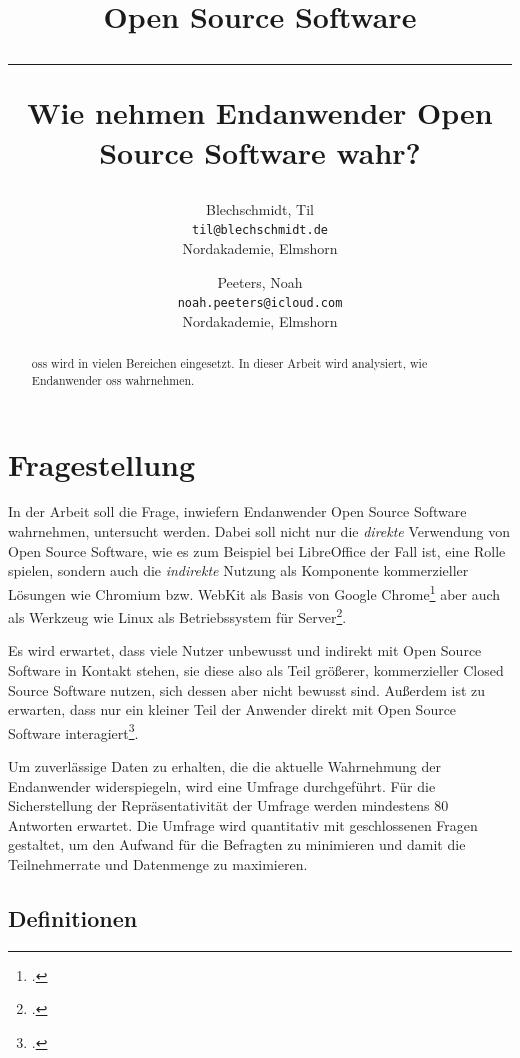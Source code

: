 \documentclass[a4paper]{article}
\title{Open Source Software \\
    \noindent\rule[0.25ex]{\linewidth}{0.5pt}
    \large Wie nehmen Endanwender Open Source Software wahr?
}
\author{
  Blechschmidt, Til\\
  \texttt{til@blechschmidt.de}\\
  Nordakademie, Elmshorn
  \and
  Peeters, Noah\\
  \texttt{noah.peeters@icloud.com}\\
  Nordakademie, Elmshorn
}
\begin{document}
    \thispagestyle{fancy}
    \maketitle

    \begin{abstract}
         \gls{oss} wird in vielen Bereichen eingesetzt. In dieser Arbeit wird analysiert, wie Endanwender \gls{oss} wahrnehmen.
    \end{abstract}
    \newpage

    \tableofcontents
    \clearpage

    
                    
    \section{Fragestellung}
        In der Arbeit soll die Frage, inwiefern Endanwender Open Source Software wahrnehmen, untersucht werden. Dabei soll nicht nur die \emph{direkte} Verwendung von Open Source Software, wie es zum Beispiel bei LibreOffice der Fall ist, eine Rolle spielen, sondern auch die \emph{indirekte} Nutzung als Komponente kommerzieller Lösungen wie Chromium bzw. WebKit als Basis von Google Chrome\footcite{is:open:source:right:for:you} aber auch als Werkzeug wie Linux als Betriebssystem für Server\footcite{report:BaselineScenario}.
		
		Es wird erwartet, dass viele Nutzer unbewusst und indirekt mit Open Source Software in Kontakt stehen, sie diese also als Teil größerer, kommerzieller Closed Source Software nutzen, sich dessen aber nicht bewusst sind. Außerdem ist zu erwarten, dass nur ein kleiner Teil der Anwender direkt mit Open Source Software interagiert\footcite{oss:lotus-to-linux}.
		
		Um zuverlässige Daten zu erhalten, die die aktuelle Wahrnehmung der Endanwender widerspiegeln, wird eine Umfrage durchgeführt. Für die Sicherstellung der Repräsentativität der Umfrage werden mindestens 80 Antworten erwartet.
		Die Umfrage wird quantitativ mit geschlossenen Fragen gestaltet, um den Aufwand für die Befragten zu minimieren und damit die Teilnehmerrate und Datenmenge zu maximieren. %
		
		\subsection{Definitionen} %
\end{document}

